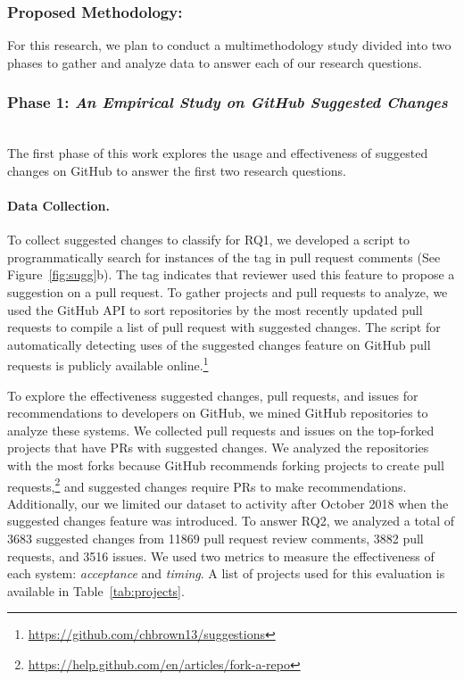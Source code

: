 \subsubsection{Proposed Methodology:} For this research, we plan to conduct a multimethodology study divided into two phases to gather and analyze data to answer each of our research questions. \\

\subsubsection{Phase 1: \textit{An Empirical Study on GitHub Suggested Changes}} \hfill\\

The first phase of this work explores the usage and effectiveness of suggested changes on GitHub to answer the first two research questions.

\paragraph{Data Collection.}

To collect suggested changes to classify for RQ1, we developed a script to programmatically search for instances of the \sugg tag in pull request comments (See Figure~\ref{fig:sugg}b). The \sugg tag indicates that reviewer used this feature to propose a suggestion on a pull request. To gather projects and pull requests to analyze, we used the GitHub API to sort repositories by the most recently updated pull requests to compile a list of pull request with suggested changes. The script for automatically detecting uses of the suggested changes feature on GitHub pull requests is publicly available online.\footnote{\url{https://github.com/chbrown13/suggestions}}

To explore the effectiveness suggested changes, pull requests, and issues for recommendations to developers on GitHub, we mined GitHub repositories to analyze these systems. We collected pull requests and issues on the top-forked projects that have PRs with suggested changes. We analyzed the repositories with the most forks because GitHub recommends forking projects to create pull requests,\footnote{\url{https://help.github.com/en/articles/fork-a-repo}} and suggested changes require PRs to make recommendations. Additionally, our we  limited our dataset to activity after October 2018 when the suggested changes feature was introduced. To answer RQ2, we analyzed a total of 3683 suggested changes from 11869 pull request review comments, 3882 pull requests, and 3516 issues. We used two metrics to measure the effectiveness of each system: \textit{acceptance} and \textit{timing}. A list of projects used for this evaluation is available in Table~\ref{tab:projects}. 

